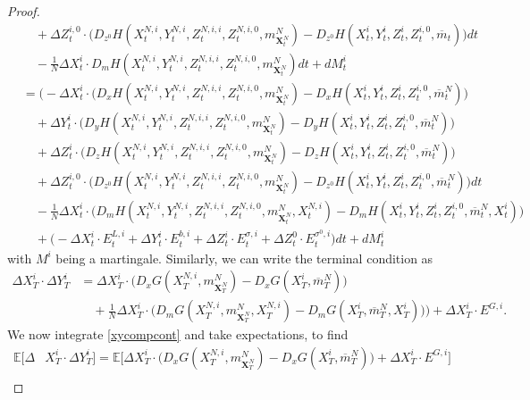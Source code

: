 \documentclass[11pt,reqno]{amsart}
\numberwithin{equation}{section}
\theoremstyle{definition}
\def\E{{\mathbb E}}
\newcommand{\bX}{\mathbf{X}}
\newcommand{\ov}{\overline}
\def \E{\mathbb{E}}
\begin{document}
\begin{proof}
\begin{align}
&\quad + \Delta Z_t^{i,0} \cdot \Big( D_{z^0} H (X_t^{N,i},Y_t^{N,i},Z_t^{N,i,i},Z_t^{N,i,0}, m_{\bX_t^N}^N) - D_{z^0} H(X_t^i,Y_t^i,Z_t^i,Z_t^{i,0}, \ov{m}_t) \Big) dt  \nonumber \\
& \quad - \frac{1}{N} \Delta X_t^i \cdot D_m H(X_t^{N,i},Y_t^{N,i},Z_t^{N,i,i},Z_t^{N,i,0}, m_{\bX_t^N}^N) dt + dM_t^i \nonumber \\
&= 
\bigg( - \Delta X_t^i\cdot\Big( D_x H (X_t^{N,i},Y_t^{N,i},Z_t^{N,i,i},Z_t^{N,i,0}, m_{\bX_t^N}^N) - D_x H(X_t^i,Y_t^i,Z_t^i,Z_t^{i,0}, \ov{m}_t^N) \bigg)  \nonumber \\
&\quad + \Delta Y_t^i\cdot\Big(D_y H (X_t^{N,i},Y_t^{N,i},Z_t^{N,i,i},Z_t^{N,i,0}, m_{\bX_t^N}^N) - D_y H(X_t^i,Y_t^i,Z_t^i,Z_t^{i,0}, \ov{m}_t^N) \Big)  \nonumber \\ 
&\quad +  \Delta Z_t^{i}\cdot \Big(D_z H (X_t^{N,i},Y_t^{N,i},Z_t^{N,i,i},Z_t^{N,i,0}, m_{\bX_t^N}^N) - D_z H(X_t^i,Y_t^i,Z_t^i,Z_t^{i,0}, \ov{m}_t^N) \Big)  \nonumber \\ 
&\quad + \Delta Z_t^{i,0} \cdot \Big( D_{z^0} H (X_t^{N,i},Y_t^{N,i},Z_t^{N,i,i},Z_t^{N,i,0}, m_{\bX_t^N}^N) - D_{z^0} H(X_t^i,Y_t^i,Z_t^i,Z_t^{i,0}, \ov{m}_t^N) \Big) dt   \nonumber \\ 
& \quad 
- \frac{1}{N} \Delta X_t^i \cdot \big(D_m H(X_t^{N,i}, Y_t^{N,i}, Z_t^{N,i,i}, Z_t^{N,i,0}, m_{\bX_t^N}^N, X_t^{N,i})
 - D_m H(X_t^{i}, Y_t^{i}, Z_t^{i}, Z_t^{i,0}, \ov{m}_t^N, X_t^i)
  \big)
\nonumber \\ 
& \quad + \Big(- \Delta X_t^i \cdot E_t^{L,i} + \Delta Y_t^i \cdot E_t^{b,i} + \Delta Z_t^i \cdot E_t^{\sigma,i} + \Delta Z_t^0 \cdot E_t^{\sigma^0,i} \Big)dt +  dM_t^i 
\end{align}
with $M^i$ being a martingale.
Similarly, we can write the terminal condition as
\begin{align*}
  \Delta X_T^i \cdot \Delta Y_T^i &= \Delta X_T^{i} \cdot \big(D_x G(X_T^{N,i}, m_{\bX_T^N}^N) - D_x G(X_T^i, \ov{m}_T^N) \big) \\
  &\quad+ \frac{1}{N} \Delta X_T^i \cdot \big(D_m G(X_T^{N,i}, m_{\bX_T^N}^N, X_T^{N,i}) - D_m G(X_T^{i}, \ov{m}_T^N, X_T^{i})  \big) \big) + \Delta X_T^i \cdot  E^{G,i}. 
\end{align*}
We now integrate \eqref{xycompcont} and take expectations, to find 
\begin{align*}
  \E[\Delta &X_T^i \cdot \Delta Y_T^i] = \E\big[\Delta X_T^{i} \cdot \big(D_x G(X_T^{N,i}, m_{\bX_T^N}^N) - D_x G(X_T^i, \ov{m}_T^N) \big) + \Delta X_T^i \cdot  E^{G,i}\big] \\

\end{align*}
\end{proof}
\end{document}
